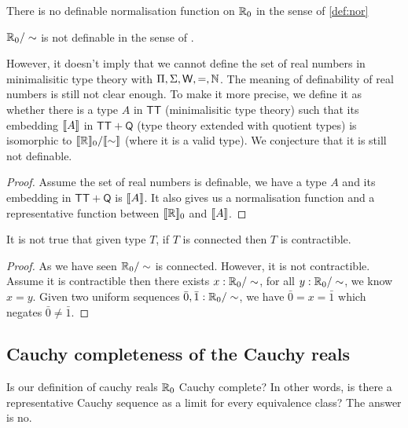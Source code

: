 \begin{corollary}
 There is no definable normalisation function on $\mathbb{R}_0$ in the sense
 of \ref{def:nor}
\end{corollary}

\begin{corollary}
 $\mathbb{R}_0 / \sim$ is not definable in the sense of \cite{aan}.
\end{corollary}


However, it doesn't imply that we cannot define the set of real numbers in minimalisitic type theory with $\Pi, \Sigma, \mathsf{W}, =,
\mathbb{N}$. The meaning of definability of real numbers is still not clear enough. To make it more precise, we define
it as whether there is a type $A$ in $\mathsf{TT}$ (minimalisitic type
theory) such that its embedding $\llbracket A\rrbracket$ in $\mathsf{TT} + \mathsf{Q}$ (type theory
extended with quotient types) is isomorphic to $\llbracket \mathbb{R}\rrbracket_0
/ \llbracket \sim\rrbracket$ (where it is a valid type). We conjecture that it is still not
definable.

\begin{proof}
Assume the set of real numbers is definable, we have a type $A$ and
its embedding in $\mathsf{TT} + \mathsf{Q}$  is $\llbracket A\rrbracket$. It also
gives us a normalisation function and a representative function
between $\llbracket \mathbb{R}\rrbracket_0$ and $\llbracket A\rrbracket$.
\end{proof}

\begin{proposition}
It is not true that given type $T$, if $T$ is connected then $T$ is contractible.
\end{proposition}
\begin{proof}
As we have seen $ \mathbb{R}_0 / \sim$ is connected. However, it is not
contractible.
Assume it is contractible then there exists $x : \mathbb{R}_0 / \sim$, for
all $y : \mathbb{R}_0 / \sim$, we know $x = y$. Given two uniform sequences
$\bar{0} , \bar{1} : \mathbb{R}_0 / \sim$, we have $\bar{0}  = x = \bar{1}$
which negates $\bar{0} \ne \bar{1}$.
\end{proof}

\subsection{Cauchy completeness of the Cauchy reals}


Is our definition of cauchy reals $\mathbb{R}_0$ Cauchy complete? In other
words, is there a representative Cauchy sequence as a limit for every
equivalence class? The answer is no.

